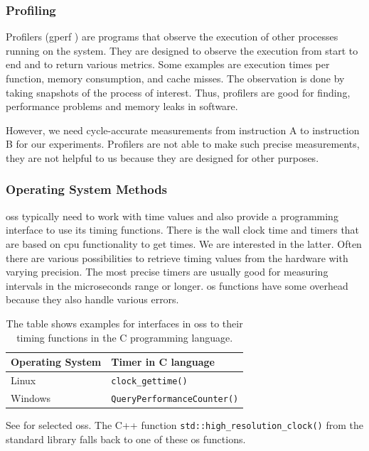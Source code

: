 \subsubsection{Profiling}
Profilers (\eg gperf \cite{graham1982gprof}) are programs that observe the execution of other processes running on the system.
They are designed to observe the execution from start to end and to return various metrics. 
Some examples are execution times per function, memory consumption, and cache misses.
The observation is done by taking snapshots of the process of interest.
Thus, profilers are good for finding, \eg performance problems and memory leaks in software.

However, we need cycle-accurate measurements from instruction A to instruction B for our experiments.
Profilers are not able to make such precise measurements, \ie they are not helpful to us because they are designed for other purposes.

\subsubsection{Operating System Methods}
\acp{os} typically need to work with time values and also provide a programming interface to use its timing functions.
There is the wall clock time and timers that are based on \ac{cpu} functionality to get times.
We are interested in the latter.
Often there are various possibilities to retrieve timing values from the hardware with varying precision.
The most precise timers are usually good for measuring intervals in the microseconds range or longer.
\ac{os} functions have some overhead because they also handle various errors.
\begin{table}
    \centering
    \begin{tabular}{@{}ll@{}}
        \toprule
        Operating System & Timer in C language \\
        \midrule
        Linux & \lstinline|clock_gettime()| \\
        Windows & \lstinline|QueryPerformanceCounter()| \\
        \bottomrule
    \end{tabular}
    \caption[Operating System Interfaces to Their Timing Functions]
    {
        The table shows examples for interfaces in \acp{os} to their timing functions in the C programming language.
    }
    \label{tab:approach:timing_functions}
\end{table}
See  for selected \acp{os}.
The C++ function \lstinline|std::high_resolution_clock()| from the standard library falls back to one of these \ac{os} functions.

